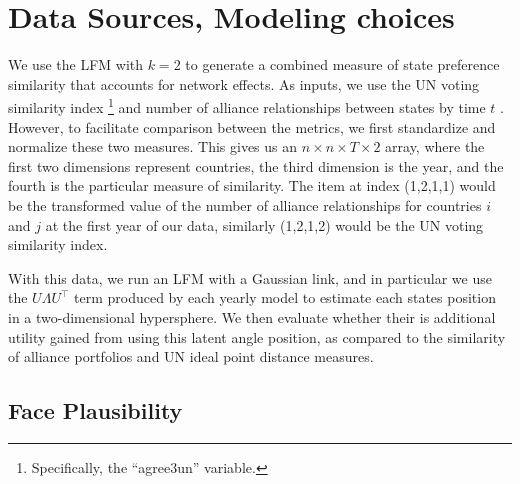 \section*{Data Sources, Modeling choices}

We use the LFM with $k=2$ to generate a combined measure of state preference similarity that accounts for network effects. As inputs, we use the UN voting similarity index \citep{voeten:2013}\footnote{Specifically, the ``agree3un'' variable.} and number of alliance relationships between states by time $t$ \citep{gibler:sarkees:2004}. However, to facilitate comparison between the metrics, we first standardize and normalize these two measures. This gives us an $n \times n \times T \times 2$ array, where the first two dimensions represent countries, the third dimension is the year, and the fourth is the particular measure of similarity. The item at index (1,2,1,1) would be the transformed value of the number of alliance relationships for countries $i$ and $j$ at the first year of our data, similarly (1,2,1,2) would be the UN voting similarity index.


With this data, we run an LFM with a Gaussian link, and in particular we use the $U \Lambda U^{\top}$ term produced by each yearly model to estimate each states position in a two-dimensional hypersphere. We then evaluate whether their is additional utility gained from using this latent angle position, as compared to the similarity of alliance portfolios and UN ideal point distance measures.

\subsection*{Face Plausibility}

